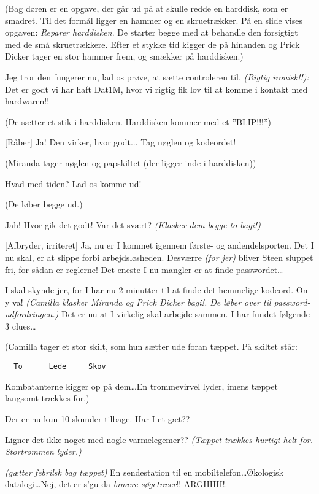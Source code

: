 \documentclass{article}
\begin{document}
\begin{sketch}
\scene (Bag døren er en opgave, der går ud på at skulle redde en
harddisk, som er smadret. Til det formål ligger en hammer og en
skruetrækker. På en slide vises opgaven: {\em Reparer harddisken\/}. De
starter begge med at behandle den forsigtigt med de små
skruetrækkere. Efter et stykke tid kigger de på hinanden og Prick Dicker
tager en stor hammer frem, og smækker på harddisken.)

 Jeg tror den fungerer nu, lad os prøve, at sætte
controleren til. {\em (Rigtig ironisk!!):\/} Det er godt vi har haft Dat1M,
hvor vi rigtig fik lov til at komme i kontakt med hardwaren!!

\scene (De sætter et stik i harddisken. Harddisken kommer med et ''BLIP!!!'')

 [Råber] Ja! Den virker, hvor godt... Tag nøglen og
kodeordet!

\scene (Miranda tager nøglen og papskiltet (der ligger inde i harddisken))

 Hvad med tiden? Lad os komme ud!

\scene (De løber begge ud.)

 Jah! Hvor gik det godt! Var det svært? {\em (Klasker dem
begge to bagi!)\/}

 [Afbryder, irriteret] Ja, nu er I kommet igennem første- og
andendelsporten. Det I nu skal, er at slippe forbi arbejdsløsheden.
Desværre {\em (for jer)\/} bliver Steen sluppet fri, for sådan er
reglerne! Det eneste I nu mangler er at finde passwordet\dots

 I skal skynde jer, for I har nu 2 minutter til at finde det
hemmelige kodeord. On y va! {\em (Camilla klasker Miranda {\em og\/} Prick
  Dicker bagi!. De løber over til password-udfordringen.)\/} Det er nu at
I virkelig skal arbejde sammen. I har fundet følgende 3 clues\dots

\scene (Camilla tager et stor skilt, som hun sætter ude foran tæppet. På
skiltet står:

\begin{verbatim}
  To      Lede     Skov
\end{verbatim}
\scene Kombatanterne kigger op på dem\ldots En trommevirvel lyder, imens
tæppet langsomt trækkes for.)

 Der er nu kun 10 skunder tilbage. Har I et gæt??

 Ligner det ikke noget med nogle varmelegemer?? {\em (Tæppet
  trækkes hurtigt helt for. Stortrommen lyder.)}

 {\em (gætter febrilsk bag tæppet)} En
sendestation til en mobiltelefon\dots Økologisk datalogi\dots Nej, det er
s'gu da {\em binære sø\-ge\-træ\-er\/}!! ARGHHH!.

\end{sketch}
\end{document}
